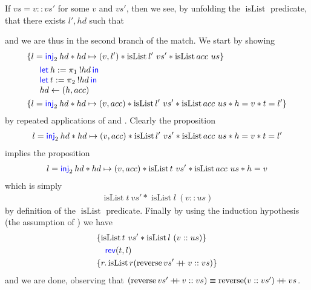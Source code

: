 \begin{example}
  If $vs=v::vs'$ for some $v$ and $vs'$, then we see, by unfolding the
  $\operatorname{isList}$ predicate, that there exists $l',hd$ such
  that
  \begin{mathpar}
  \end{mathpar}
  and we are thus in the second branch of the match.
  We start by showing
  \begin{align*}
    \hoareV{l = \Inj2 hd * hd\pointsto(v,l') * \operatorname{isList} l'~vs' * \operatorname{isList} acc~us}
    {\begin{array}{l}
       \Let h = \Proj1 !hd in\\
       \Let t = \Proj2 !hd in\\
       hd\gets(h,acc)
     \end{array}
    }
    {l = \Inj2 hd * hd\pointsto(v,acc) * \operatorname{isList} l'~vs' * \operatorname{isList} acc~us * h = v * t = l'}
  \end{align*}
  by repeated applications of  and .
  Clearly the proposition
  \begin{align*}
    l = \Inj2 hd * hd\pointsto(v,acc) * \operatorname{isList} l'~vs' * \operatorname{isList} acc~us * h = v * t = l'
  \end{align*}
  implies the proposition
  \begin{align*}
    l = \Inj2 hd * hd\pointsto(v,acc) * \operatorname{isList} t~vs' * \operatorname{isList} acc~us * h = v
  \end{align*}
  which is simply
  \begin{align*}
    \operatorname{isList} t~vs' * \operatorname{isList} l~(v::us)
  \end{align*}
  by definition of the $\operatorname{isList}$ predicate.
  Finally by using the induction hypothesis (the assumption of ) we have 
  \begin{align*}
    \hoareV{\operatorname{isList} t~vs' * \operatorname{isList} l~(v::us)}
    {\langkw{rev}(t,l)}
    {r. \operatorname{isList} r (\operatorname{reverse} vs' \mdoubleplus v::vs)}
  \end{align*}
  and we are done, observing that $(\operatorname{reverse} vs' \mdoubleplus v :: vs) \equiv \operatorname{reverse} (v::vs') \mdoubleplus vs$.


\end{example}
